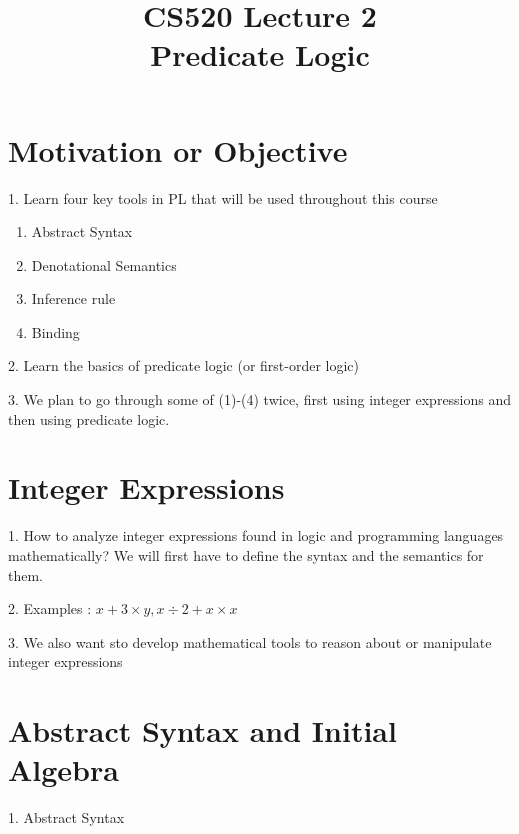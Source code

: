 \documentclass{report}[12pt]
\begin{document}
\setlength\parindent{0pt}

  {\topsep}{\topsep}%
  {\itshape}{}%
  {\bfseries}{}%
  {\newline}{}%

\theoremstyle{break}

\newtheorem{theorem}{Theorem}[section]
\newtheorem{definition}{Definition}
\newtheorem{proposition}{Proposition}
\newtheorem{corollary}{Corollary}
\newtheorem{lemma}{Lemma}
\newtheorem{example}{Example}
\newcommand{\nonterminal}[1]{\langle \text{#1}\rangle}
\newcommand{\rem}[0]{\text{ rem }}
\newcommand{\interp}[1]{\llbracket #1 \rrbracket}

\setcounter{chapter}{2}

\title{CS520 Lecture 2\\Predicate Logic}
\maketitle

\section{Motivation or Objective}
1. Learn four key tools in PL that will be used throughout this course

\begin{enumerate}
    \item Abstract Syntax
    \item Denotational Semantics
    \item Inference rule
    \item Binding
\end{enumerate}
2. Learn the basics of predicate logic (or first-order logic)

3. We plan to go through some of (1)-(4) twice, first using integer expressions and then using predicate logic.

\section{Integer Expressions}
1. How to analyze integer expressions found in logic and programming languages mathematically? We will first have to define the syntax and the semantics for them.

2. Examples : $x+3\times y, x\div 2 + x \times x$

3. We also want sto develop mathematical tools to reason about or manipulate integer expressions
\section{Abstract Syntax and Initial Algebra}
1. Abstract Syntax
\end{document}
